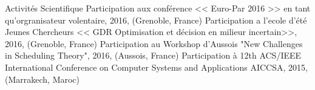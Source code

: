 \begin{rubric}{Activités Scientifique}
\entry*[]	Participation aux conférence << Euro-Par 2016 >> en tant qu'orgranisateur volentaire, 2016, (Grenoble, France) 
\entry*[]	Participation a l'ecole d'été Jeunes Chercheurs << GDR Optimisation et décision en milieur incertain>>, 2016, (Grenoble, France)	
\entry*[]	Participation au Workshop d'Aussois "New Challenges in Scheduling Theory", 2016, (Aussois, France)	
\entry*[]	Participation à 12th ACS/IEEE International Conference on Computer Systems and Applications AICCSA, 2015, (Marrakech, Maroc) 	
\end{rubric}
